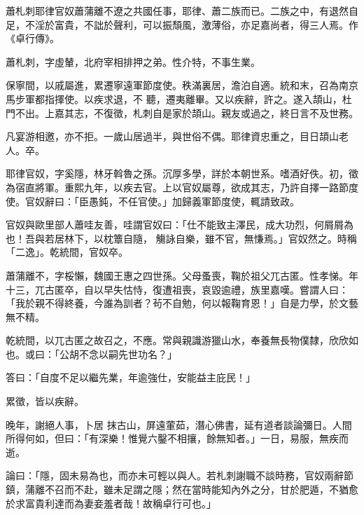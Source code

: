 
\begin{pinyinscope}

 蕭札刺耶律官奴蕭蒲離不遼之共國任事，耶律、蕭二族而已。二族之中，有退然自足，不淫於富貴，不詘於聲利，可以振頹風，激薄俗，亦足嘉尚者，得三人焉。作《卓行傳》。



 蕭札刺，字虛輦，北府宰相排押之弟。性介特，不事生業。



 保寧間，以戚屬進，累遷寧遠軍節度使。秩滿裏居，澹泊自適。統和末，召為南京馬步軍都指揮使。以疾求退，不
 聽，遷夷離畢。又以疾辭，許之。遂入頡山，杜門不出。上嘉其志，不復徵，札刺自是家於頡山。親友或過之，終日言不及世務。



 凡宴游相邀，亦不拒。一歲山居過半，與世俗不偶。耶律資忠重之，目日頡山老人。卒。



 耶律官奴，字奚隱，林牙斡魯之孫。沉厚多學，詳於本朝世系。嗜酒好佚。初，徵為宿直將軍。重熙九年，以疾去官。上以官奴屬尊，欲成其志，乃許自擇一路節度使。官奴辭曰：「臣愚鈍，不任官使。」加歸義軍節度使，輒請致政。



 官奴與歐里部人蕭哇友善，哇謂官奴曰：「仕不能致主澤民，成大功烈，何屑屑為也！吾與若居林下，以枕簟自隨，
 觴詠自樂，雖不官，無慊焉。」官奴然之。時稱「二逸」。乾統間，官奴卒。



 蕭蒲離不，字桵懶，魏國王惠之四世孫。父母蚤喪，鞠於祖父兀古匿。性孝悌。年十三，兀古匿卒，自以早失怙恃，復遭祖喪，哀毀逾禮，族里嘉嘆。嘗謂人曰：「我於親不得終養，今誰為訓者？茍不自勉，何以報鞠育恩！」自是力學，於文藝無不精。



 乾統間，以兀古匿之故召之，不應。常與親識游獵山水，奉養無長物僕隸，欣欣如也。或曰：「公胡不念以嗣先世功名？」



 答曰：「自度不足以繼先業，年逾強仕，安能益主庇民！」



 累徵，皆以疾辭。



 晚年，謝絕人事，卜居
 抹古山，屏遠葷茹，潛心佛書，延有道者談論彌日。人間所得何如，但曰：「有深樂！惟覺六鑿不相攘，餘無知者。」一日，易服，無疾而逝。



 論曰：「隱，固未易為也，而亦未可輕以與人。若札刺謝職不談時務，官奴兩辭節鎮，蒲離不召而不赴，雖未足謂之隱；然在當時能知內外之分，甘於肥遁，不猶愈於求富貴利達而為妻妾羞者哉！故稱卓行可也。」



\end{pinyinscope}